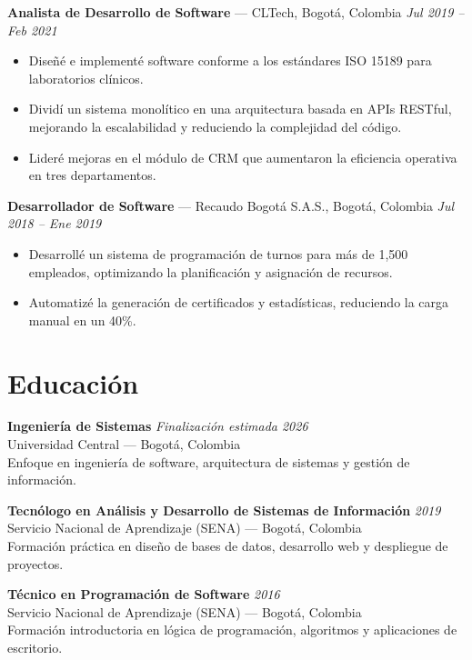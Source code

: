 \documentclass[10.5pt,letterpaper]{article}
\begin{document}
	\textbf{Analista de Desarrollo de Software} — CLTech, Bogotá, Colombia
	\hfill
	\textit{Jul 2019 – Feb 2021}
	\begin{itemize}
		\item Diseñé e implementé software conforme a los estándares ISO 15189 para laboratorios clínicos.
		\item Dividí un sistema monolítico en una arquitectura basada en APIs RESTful, mejorando la escalabilidad y reduciendo la complejidad del código.
		\item Lideré mejoras en el módulo de CRM que aumentaron la eficiencia operativa en tres departamentos.
	\end{itemize}
	
	\textbf{Desarrollador de Software} — Recaudo Bogotá S.A.S., Bogotá, Colombia  
	\hfill
	\textit{Jul 2018 – Ene 2019}
	\begin{itemize}
		\item Desarrollé un sistema de programación de turnos para más de 1,500 empleados, optimizando la planificación y asignación de recursos.
		\item Automatizé la generación de certificados y estadísticas, reduciendo la carga manual en un 40\%.
	\end{itemize}
	
	\section*{Educación}
	
	\textbf{Ingeniería de Sistemas} \hfill \textit{Finalización estimada 2026} \\  
	Universidad Central — Bogotá, Colombia \\  
	Enfoque en ingeniería de software, arquitectura de sistemas y gestión de información.
	
	\textbf{Tecnólogo en Análisis y Desarrollo de Sistemas de Información} \hfill \textit{2019} \\  
	Servicio Nacional de Aprendizaje (SENA) — Bogotá, Colombia \\  
	Formación práctica en diseño de bases de datos, desarrollo web y despliegue de proyectos.
	
	\textbf{Técnico en Programación de Software} \hfill \textit{2016} \\  
	Servicio Nacional de Aprendizaje (SENA) — Bogotá, Colombia \\  
	Formación introductoria en lógica de programación, algoritmos y aplicaciones de escritorio.
	
\end{document}
